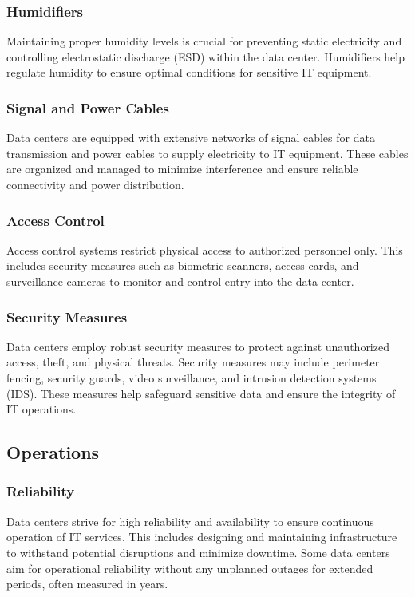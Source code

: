 \documentclass[a4paper,12pt]{report}
\begin{document}
	\subsubsection{Humidifiers}
	Maintaining proper humidity levels is crucial for preventing static electricity and controlling electrostatic discharge (ESD) within the data center. Humidifiers help regulate humidity to ensure optimal conditions for sensitive IT equipment.
	
	\subsubsection{Signal and Power Cables}
	Data centers are equipped with extensive networks of signal cables for data transmission and power cables to supply electricity to IT equipment. These cables are organized and managed to minimize interference and ensure reliable connectivity and power distribution.
	
	\subsubsection{Access Control}
	Access control systems restrict physical access to authorized personnel only. This includes security measures such as biometric scanners, access cards, and surveillance cameras to monitor and control entry into the data center.
	
	\subsubsection{Security Measures}
	Data centers employ robust security measures to protect against unauthorized access, theft, and physical threats. Security measures may include perimeter fencing, security guards, video surveillance, and intrusion detection systems (IDS). These measures help safeguard sensitive data and ensure the integrity of IT operations.
	
	\subsection{Operations}
	
	\subsubsection{Reliability}
	Data centers strive for high reliability and availability to ensure continuous operation of IT services. This includes designing and maintaining infrastructure to withstand potential disruptions and minimize downtime. Some data centers aim for operational reliability without any unplanned outages for extended periods, often measured in years.
	
\end{document}
